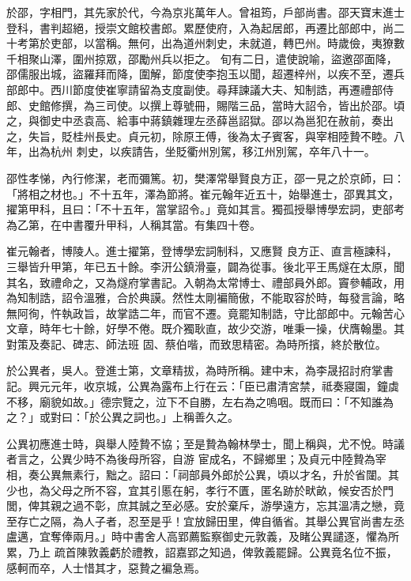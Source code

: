 \begin{pinyinscope}
 於邵，字相門，其先家於代，今為京兆萬年人。曾祖筠，戶部尚書。邵天寶末進士登科，書判超絕，授崇文館校書郎。累歷使府，入為起居郎，再遷比部郎中，尚二十考第於吏部，以當稱。無何，出為道州刺史，未就道，轉巴州。時歲儉，夷獠數千相聚山澤，圍州掠眾，邵勵州兵以拒之。
 旬有二日，遣使說喻，盜邀邵面降，邵儒服出城，盜羅拜而降，圍解，節度使李抱玉以聞，超遷梓州，以疾不至，遷兵部郎中。西川節度使崔寧請留為支度副使。尋拜諫議大夫、知制誥，再遷禮部侍郎、史館修撰，為三司使。以撰上尊號冊，賜階三品，當時大詔令，皆出於邵。頃之，與御史中丞袁高、給事中蔣鎮雜理左丞薛邕詔獄。邵以為邕犯在赦前，奏出之，失旨，貶桂州長史。貞元初，除原王傅，後為太子賓客，與宰相陸贄不睦。八年，出為杭州
 刺史，以疾請告，坐貶衢州別駕，移江州別駕，卒年八十一。



 邵性孝悌，內行修潔，老而彌篤。初，樊澤常舉賢良方正，邵一見之於京師，曰：「將相之材也。」不十五年，澤為節將。崔元翰年近五十，始舉進士，邵異其文，擢第甲科，且曰：「不十五年，當掌詔令。」竟如其言。獨孤授舉博學宏詞，吏部考為乙第，在中書覆升甲科，人稱其當。有集四十卷。



 崔元翰者，博陵人。進士擢第，登博學宏詞制科，又應賢
 良方正、直言極諫科，三舉皆升甲第，年已五十餘。李汧公鎮滑臺，闢為從事。後北平王馬燧在太原，聞其名，致禮命之，又為燧府掌書記。入朝為太常博士、禮部員外郎。竇參輔政，用為知制誥，詔令溫雅，合於典謨。然性太剛褊簡傲，不能取容於時，每發言論，略無阿徇，忤執政旨，故掌誥二年，而官不遷。竟罷知制誥，守比部郎中。元翰苦心文章，時年七十餘，好學不倦。既介獨耿直，故少交游，唯秉一操，伏膺翰墨。其對策及奏記、碑志、師法班
 固、蔡伯喈，而致思精密。為時所擯，終於散位。



 於公異者，吳人。登進士第，文章精拔，為時所稱。建中末，為李晟招討府掌書記。興元元年，收京城，公異為露布上行在云：「臣已肅清宮禁，祗奏寢園，鐘虡不移，廟貌如故。」德宗覽之，泣下不自勝，左右為之嗚咽。既而曰：「不知誰為之？」或對曰：「於公異之詞也。」上稱善久之。



 公異初應進士時，與舉人陸贄不協；至是贄為翰林學士，聞上稱與，尤不悅。時議者言之，公異少時不為後母所容，自游
 宦成名，不歸鄉里；及貞元中陸贄為宰相，奏公異無素行，黜之。詔曰：「祠部員外郎於公異，頃以才名，升於省闥。其少也，為父母之所不容，宜其引慝在躬，孝行不匱，匿名跡於畎畝，候安否於門閭，俾其親之過不彰，庶其誠之至必感。安於棄斥，游學遠方，忘其溫凊之戀，竟至存亡之隔，為人子者，忍至是乎！宜放歸田里，俾自循省。其舉公異官尚書左丞盧邁，宜奪俸兩月。」時中書舍人高郢薦監察御史元敦義，及睹公異譴逐，懼為所累，乃上
 疏首陳敦義虧於禮教，詔嘉郢之知過，俾敦義罷歸。公異竟名位不振，感軻而卒，人士惜其才，惡贄之褊急焉。




\end{pinyinscope}
